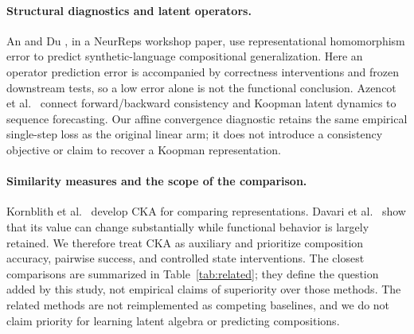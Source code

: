 \paragraph{Structural diagnostics and latent operators.}
An and Du \cite{an2026}, in a NeurReps workshop paper, use representational homomorphism error to predict synthetic-language compositional generalization. Here an operator prediction error is accompanied by correctness interventions and frozen downstream tests, so a low error alone is not the functional conclusion. Azencot et al.\ \cite{azencot2020} connect forward/backward consistency and Koopman latent dynamics to sequence forecasting. Our affine convergence diagnostic retains the same empirical single-step loss as the original linear arm; it does not introduce a consistency objective or claim to recover a Koopman representation.

\paragraph{Similarity measures and the scope of the comparison.}
Kornblith et al.\ \cite{kornblith2019} develop CKA for comparing representations. Davari et al.\ \cite{davari2022} show that its value can change substantially while functional behavior is largely retained. We therefore treat CKA as auxiliary and prioritize composition accuracy, pairwise success, and controlled state interventions. The closest comparisons are summarized in Table~\ref{tab:related}; they define the question added by this study, not empirical claims of superiority over those methods. The related methods are not reimplemented as competing baselines, and we do not claim priority for learning latent algebra or predicting compositions.

